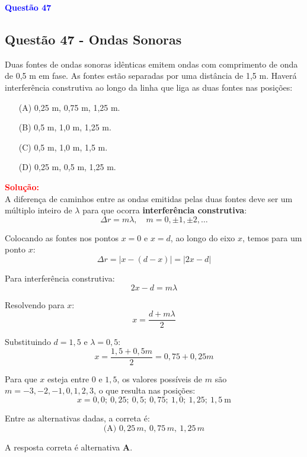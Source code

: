 \begin{flushleft}
\textbf{\textcolor{blue}{\Large Quest\~ao 47}}\\
\noindent
\subsection{Quest\~ao 47 - Ondas Sonoras}
Duas fontes de ondas sonoras idênticas emitem ondas com
comprimento de onda de 0,5 m em fase. As fontes estão
separadas por uma distância de 1,5 m. Haverá interferência
construtiva ao longo da linha que liga as duas fontes nas
posições:

\begin{itemize}
\item[(A)] 0,25 m, 0,75 m, 1,25 m.
\item[(B)] 0,5 m, 1,0 m, 1,25 m.
\item[(C)] 0,5 m, 1,0 m, 1,5 m.
\item[(D)] 0,25 m, 0,5 m, 1,25 m.
\end{itemize}

\vspace{0.5cm}

\textcolor{red}{\textbf{Solução:}}\\

\colorbox{yellow!30}{A diferença de caminhos entre as ondas emitidas pelas duas fontes deve ser um múltiplo} 
\colorbox{yellow!30}{inteiro de \( \lambda \) para que ocorra \textbf{interferência construtiva}:}
\[
\Delta r = m\lambda, \quad m = 0, \pm1, \pm2, \dots
\]

Colocando as fontes nos pontos \( x=0 \) e \( x=d \), ao longo do eixo \( x \), temos para um ponto \( x \):
\[
\Delta r = |x - (d-x)| = |2x - d|
\]

Para interferência construtiva:
\[
2x - d = m\lambda
\]

Resolvendo para \( x \):
\[
x = \frac{d + m\lambda}{2}
\]

Substituindo \( d = 1{,}5 \) e \( \lambda = 0{,}5 \):
\[
x = \frac{1{,}5 + 0{,}5m}{2} = 0{,}75 + 0{,}25m
\]

Para que \( x \) esteja entre \( 0 \) e \( 1{,}5 \), os valores possíveis de \( m \) são \( m = -3, -2, -1, 0, 1, 2, 3 \), o que resulta nas posições:
\[
x = 0{,}0;\ 0{,}25;\ 0{,}5;\ 0{,}75;\ 1{,}0;\ 1{,}25;\ 1{,}5 \ \mathrm{m}
\]

Entre as alternativas dadas, a correta é:
\[
\boxed{\text{(A) } 0{,}25\,m,\ 0{,}75\,m,\ 1{,}25\,m}
\]


A resposta correta é alternativa \colorbox{green!50}{\textbf{A}}.
\end{flushleft}

